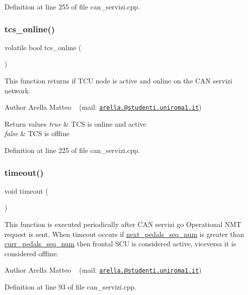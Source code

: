 Definition at line 255 of file can\+\_\+servizi.\+cpp.

\mbox{\label{group___c_a_n__servizi__group_ga0c5f72386ae62e3e0b6908efa2fb2b28}} 
\subsubsection{\texorpdfstring{tcs\+\_\+online()}{tcs\_online()}}
{\footnotesize\ttfamily volatile bool tcs\+\_\+online (\begin{DoxyParamCaption}{ }\end{DoxyParamCaption})}



This function returns if T\+CU node is active and online on the C\+AN servizi network. 

\begin{DoxyAuthor}{Author}
Arella Matteo ~\newline
 (mail\+: \href{mailto:arella.1646983@studenti.uniroma1.it}{\tt arella.@studenti.\+uniroma1.\+it})
\end{DoxyAuthor}

\begin{DoxyRetVals}{Return values}
{\em true} & T\+CS is online and active \\
\hline
{\em false} & T\+CS is offline \\
\hline
\end{DoxyRetVals}


Definition at line 225 of file can\+\_\+servizi.\+cpp.

\mbox{\label{group___c_a_n__servizi__group_gad446b5782bcb2d8ffc0aa1f8c4d16ded}} 
\subsubsection{\texorpdfstring{timeout()}{timeout()}}
{\footnotesize\ttfamily void timeout (\begin{DoxyParamCaption}{ }\end{DoxyParamCaption})}



This function is executed periodically after C\+AN servizi \textquotesingle{}go Operational\textquotesingle{} N\+MT request is sent. When timeout occurs if \mbox{\hyperlink{group___c_a_n__servizi__group_gadcbd4ad67b50cf61731266bf5c5ba158}{next\+\_\+pedals\+\_\+seq\+\_\+num}} is greater than \mbox{\hyperlink{group___c_a_n__servizi__group_gacad002b7cb06bffa8811859e6f53cb28}{curr\+\_\+pedals\+\_\+seq\+\_\+num}} then frontal S\+CU is considered active, viceversa it is considered offline. 

\begin{DoxyAuthor}{Author}
Arella Matteo ~\newline
 (mail\+: \href{mailto:arella.1646983@studenti.uniroma1.it}{\tt arella.@studenti.\+uniroma1.\+it}) 
\end{DoxyAuthor}


Definition at line 93 of file can\+\_\+servizi.\+cpp.

